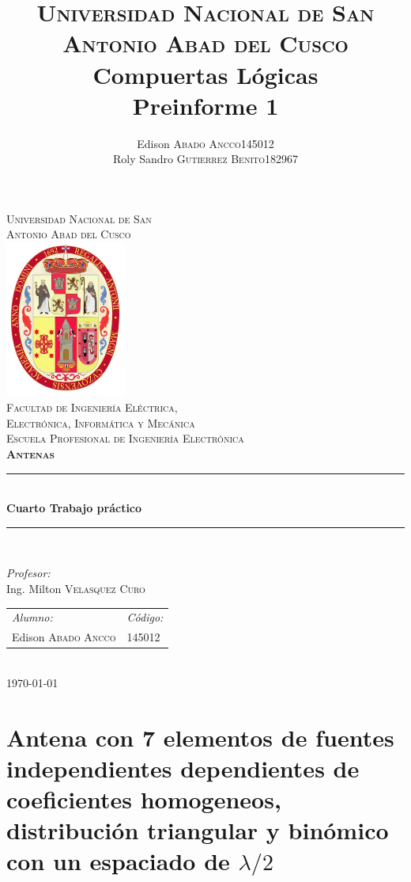 \documentclass[11pt]{book}
\title{
	\textsc{Universidad Nacional de San Antonio Abad del Cusco}\\
	\textbf{Compuertas Lógicas}\\
	Preinforme 1}
\author{
	\begin{tabular}{lr}
		Edison \textsc{Abado Ancco} & 145012 \\
		Roly Sandro \textsc{Gutierrez Benito} & 182967\\
	\end{tabular}
}
\begin{document}
	
\begin{titlepage}
	\newcommand{\HRule}{\rule{\linewidth}{0.5mm}} 
	\center
	\textsc{\LARGE  Universidad Nacional de San \\[0.2cm] Antonio Abad del Cusco}\\[1.5cm] 
	\includegraphics[width=4cm]{IMAGENES/escudo}\\[1cm]
	\textsc{\Large Facultad de Ingeniería Eléctrica, \\ Electrónica, Informática y Mecánica}\\[0.5cm] 
	\textsc{\large Escuela Profesional de Ingeniería Electrónica}\\[0.5cm]
	\textsc{\Large \textbf{Antenas}}\\[0.5cm] 
	\HRule \\[0.4cm]
	{ \huge \bfseries Cuarto Trabajo práctico}\\[0.4cm] 
	\HRule \\[1.5cm]
	\begin{minipage}{\textwidth}
		\center 
		
		\emph{Profesor:} \\
		Ing. Milton \textsc{Velasquez Curo} \\[1cm]
		
		\begin{tabular}{ll}
			\emph{Alumno:} & \emph{Código:}\\
			Edison \textsc{Abado Ancco} & 145012 \\
		\end{tabular}
	\end{minipage}\\[2cm]
	\today
\end{titlepage}


\newpage


\chapter{Antena con 7 elementos de fuentes independientes dependientes de coeficientes homogeneos, distribución triangular y binómico con un espaciado de $\lambda/2$}
\end{document}
